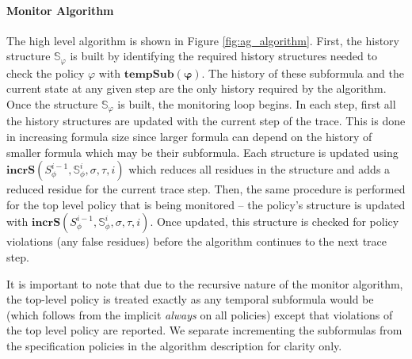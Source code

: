 \documentclass[]{llncs}
\begin{document}
\paragraph{Monitor Algorithm}
The high level algorithm is shown in Figure \ref{fig:ag_algorithm}. First, the history structure $\mathbb{S}_{\varphi}$ is built by identifying the required history structures needed to check the policy $\varphi$ with $\mathbf{tempSub(\varphi)}$. 
The history of these subformula and the current state at any given step are the only history required by the algorithm. Once the structure $\mathbb{S}_{\varphi}$ is built, the monitoring loop begins. 
In each step, first all the history structures are updated with the current step of the trace. This is done in increasing formula size since larger formula can depend on the history of smaller formula which may be their subformula.
Each structure is updated using $\mathbf{incrS}(S^{i-1}_\phi,\mathbb{S}^i_\phi,\sigma,\tau,i)$ which reduces all residues in the structure and adds a reduced residue for the current trace step. 
Then, the same procedure is performed for the top level policy that is being monitored -- the policy's structure is updated with $\mathbf{incrS}(S^{i-1}_\phi,\mathbb{S}^i_\phi,\sigma,\tau,i)$.
Once updated, this structure is checked for policy violations (any false residues) before the algorithm continues to the next trace step.

It is important to note that due to the recursive nature of the monitor algorithm, the top-level policy is treated exactly as any temporal subformula would be (which follows from the implicit \emph{always} on all policies) except that violations of the top level policy are reported. We separate incrementing the subformulas from the specification policies in the algorithm description for clarity only.
\end{document}

